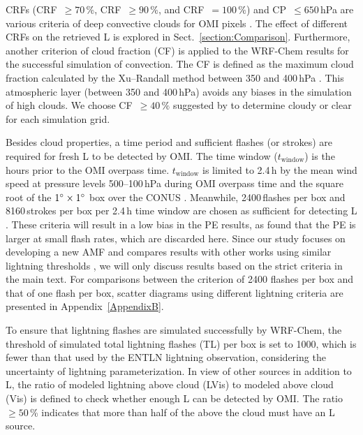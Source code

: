 \documentclass[amt]{copernicus}
\begin{document}
CRFs (CRF~$\geq 70$\,{\%}, CRF~$\geq 90\,{\%}$, and CRF~$= 100\,{\%}$) and CP~$\leq 650$\,hPa are various criteria of deep convective clouds for OMI pixels \citep{Ziemke.2009,Choi.2014,Pickering.2016}.
The effect of different CRFs on the retrieved L is explored in Sect.~\ref{section:Comparison}.
Furthermore, another criterion of cloud fraction (CF) is applied to the WRF-Chem results for the successful simulation of convection.
The CF is defined as the maximum cloud fraction calculated by the Xu--Randall method between 350 and 400\,hPa \citep{Xu.1996,Strode.2017}.
This atmospheric layer (between 350 and 400\,hPa) avoids any biases in the simulation of high clouds.
We choose CF~$\geq 40\,{\%}$ suggested by \citet{Strode.2017} to determine cloudy or clear for each simulation grid.

Besides cloud properties, a time period and sufficient flashes (or strokes) are required for fresh L to be detected by OMI.
The time window ($t_\mathrm{window}$) is the hours prior to the OMI overpass time.
$t_\mathrm{window}$ is limited to 2.4\,h by the mean wind speed at pressure levels 500--100\,hPa during OMI overpass time and the square root of the $1{^{\circ}}\times 1{^{\circ}}$ box over the CONUS \citep{Lapierre.2020}.
Meanwhile, 2400\,flashes per box and 8160\,strokes per box per 2.4\,h time window are chosen as sufficient for detecting L \citep{Lapierre.2020}.
These criteria will result in a low bias in the PE results, as \citet{Bucsela.2019} found that the PE is larger at small flash rates, which are discarded here.
Since our study focuses on developing a new AMF and compares results with other works using similar lightning thresholds \citep{Lapierre.2020,Pickering.2016}, we will only discuss results based on the strict criteria in the main text.
For comparisons between the criterion of 2400 flashes per box and that of one flash per box, scatter diagrams using different lightning criteria are presented in Appendix~\ref{AppendixB}.

To ensure that lightning flashes are simulated successfully by WRF-Chem, the threshold of simulated total lightning flashes (TL) per box is set to 1000, which is fewer than that used by the ENTLN lightning observation, considering the uncertainty of lightning parameterization.
In view of other  sources in addition to L, the ratio of modeled lightning  above cloud (LVis) to modeled  above cloud (Vis) is defined to check whether enough L can be detected by OMI.
The ratio $\geq 50$\,{\%} indicates that more than half of the  above the cloud must have an L source.
\end{document}
